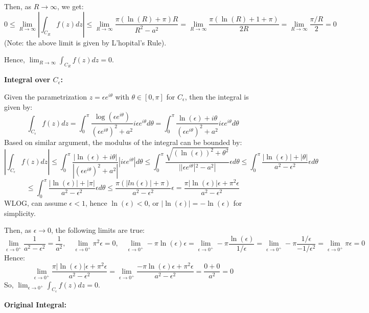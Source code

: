 \documentclass{article}
\begin{document}
Then, as $R\rightarrow\infty$, we get:
$$0\leq \lim_{R\rightarrow\infty}\left|\int_{C_R}f(z)dz\right| \leq \lim_{R\rightarrow\infty}\frac{\pi(\ln(R)+\pi)R}{R^2-a^2} = \lim_{R\rightarrow\infty}\frac{\pi(\ln(R)+1+\pi)}{2R} = \lim_{R\rightarrow\infty}\frac{\pi/R}{2} = 0$$
(Note: the above limit is given by L'hopital's Rule).

Hence, $\lim_{R\rightarrow\infty}\int_{C_R}f(z)dz = 0$.

\hfil

\textbf{Integral over $C_\epsilon$:}

Given the parametrization $z=\epsilon e^{i\theta}$ with $\theta\in [0,\pi]$ for $C_\epsilon$, then the integral is given by:
$$\int_{C_\epsilon}f(z)dz = \int_{0}^{\pi}\frac{\log(\epsilon e^{i\theta})}{(\epsilon e^{i\theta})^2+a^2}i\epsilon e^{i\theta}d\theta=\int_{0}^{\pi}\frac{\ln(\epsilon)+i\theta}{(\epsilon e^{i\theta})^2+a^2}i\epsilon e^{i\theta}d\theta$$
Based on similar argument, the modulus of the integral can be bounded by:
$$\left|\int_{C_\epsilon}f(z)dz\right|\leq \int_{0}^{\pi}\frac{|\ln(\epsilon)+i\theta|}{|(\epsilon e^{i\theta})^2+a^2|}|i\epsilon e^{i\theta}|d\theta \leq \int_{0}^{\pi}\frac{\sqrt{(\ln(\epsilon))^2+\theta^2}}{||\epsilon e^{i\theta}|^2-a^2|}\epsilon d\theta \leq \int_{0}^{\pi}\frac{|\ln(\epsilon)|+|\theta|}{a^2-\epsilon^2}\epsilon d\theta$$
$$\leq \int_{0}^{\pi}\frac{|\ln(\epsilon)|+|\pi|}{a^2-\epsilon^2}\epsilon d\theta\leq \frac{\pi(|ln(\epsilon)|+\pi)}{a^2-\epsilon^2}\epsilon = \frac{\pi|\ln(\epsilon)|\epsilon +\pi^2\epsilon}{a^2-\epsilon^2}$$
WLOG, can assume $\epsilon<1$, hence $\ln(\epsilon)<0$, or $|\ln(\epsilon)|=-\ln(\epsilon)$ for simplicity.

Then, as $\epsilon\rightarrow 0$, the following limits are true:
$$\lim_{\epsilon\rightarrow 0^+}\frac{1}{a^2-\epsilon^2} = \frac{1}{a^2},\quad \lim_{\epsilon\rightarrow 0^+}\pi^2\epsilon = 0,\quad \lim_{\epsilon\rightarrow 0^+}-\pi\ln(\epsilon)\epsilon = \lim_{\epsilon\rightarrow 0^+}-\pi\frac{\ln(\epsilon)}{1/\epsilon} = \lim_{\epsilon\rightarrow 0^+}-\pi\frac{1/\epsilon}{-1/\epsilon^2} = \lim_{\epsilon\rightarrow 0^+}\pi \epsilon = 0$$
Hence:
$$\lim_{\epsilon\rightarrow 0^+}\frac{\pi|\ln(\epsilon)|\epsilon +\pi^2\epsilon}{a^2-\epsilon^2} = \lim_{\epsilon\rightarrow 0^+}\frac{-\pi\ln(\epsilon)\epsilon +\pi^2\epsilon}{a^2-\epsilon^2} = \frac{0+0}{a^2}=0$$
So, $\lim_{\epsilon\rightarrow 0^+}\int_{C_\epsilon}f(z)dz = 0$.

\hfil

\textbf{Original Integral:}
\end{document}
